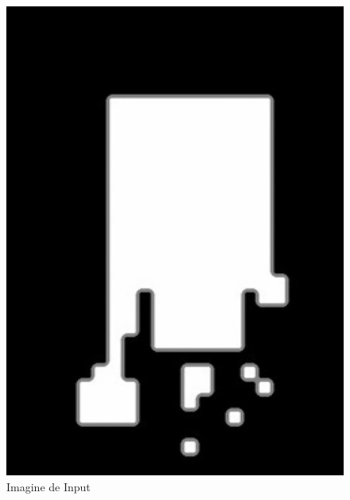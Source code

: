 \documentclass[a4paper,12pt]{report}
\begin{document}
\begin{figure}[h!]
    \centering
    \begin{minipage}{0.25\textwidth}
        \centering
        \includegraphics[width=1\textwidth]{images/input_close.jpg}
        \caption{Imagine de Input}
    \end{minipage}
    \hspace{0.05\textwidth}
    \begin{minipage}{0.25\textwidth}
        \centering

\end{minipage}
\end{figure}
\end{document}
